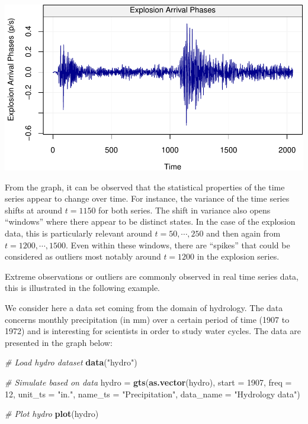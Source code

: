 \documentclass[]{book}
\newenvironment{Shaded}{\begin{snugshade}}{\end{snugshade}}
\newcommand{\CommentTok}[1]{\textcolor[rgb]{0.56,0.35,0.01}{\textit{#1}}}
\newcommand{\DataTypeTok}[1]{\textcolor[rgb]{0.13,0.29,0.53}{#1}}
\newcommand{\DecValTok}[1]{\textcolor[rgb]{0.00,0.00,0.81}{#1}}
\newcommand{\KeywordTok}[1]{\textcolor[rgb]{0.13,0.29,0.53}{\textbf{#1}}}
\newcommand{\NormalTok}[1]{#1}
\newcommand{\StringTok}[1]{\textcolor[rgb]{0.31,0.60,0.02}{#1}}
\theoremstyle{definition}
\theoremstyle{definition}
\theoremstyle{definition}
\theoremstyle{remark}
\let\BeginKnitrBlock\begin \let\EndKnitrBlock\end
\begin{document}
\begin{center}\includegraphics{ts_files/figure-latex/example_EQ-2} \end{center}

From the graph, it can be observed that the statistical properties of
the time series appear to change over time. For instance, the variance
of the time series shifts at around \(t = 1150\) for both series. The
shift in variance also opens ``windows'' where there appear to be
distinct states. In the case of the explosion data, this is particularly
relevant around \(t = 50, \cdots, 250\) and then again from
\(t = 1200, \cdots, 1500\). Even within these windows, there are
``spikes'' that could be considered as outliers most notably around
\(t = 1200\) in the explosion series.

Extreme observations or outliers are commonly observed in real time
series data, this is illustrated in the following example.

\BeginKnitrBlock{example}
\protect\hypertarget{exm:precipitation}{}{\label{exm:precipitation} }We
consider here a data set coming from the domain of hydrology. The data
concerns monthly precipitation (in mm) over a certain period of time
(1907 to 1972) and is interesting for scientists in order to study water
cycles. The data are presented in the graph below:
\EndKnitrBlock{example}

\begin{Shaded}
\begin{Highlighting}[]
\CommentTok{# Load hydro dataset}
\KeywordTok{data}\NormalTok{(}\StringTok{"hydro"}\NormalTok{)}

\CommentTok{# Simulate based on data}
\NormalTok{hydro =}\StringTok{ }\KeywordTok{gts}\NormalTok{(}\KeywordTok{as.vector}\NormalTok{(hydro), }\DataTypeTok{start =} \DecValTok{1907}\NormalTok{, }\DataTypeTok{freq =} \DecValTok{12}\NormalTok{, }\DataTypeTok{unit_ts =} \StringTok{"in."}\NormalTok{, }
            \DataTypeTok{name_ts =} \StringTok{"Precipitation"}\NormalTok{, }\DataTypeTok{data_name =} \StringTok{"Hydrology data"}\NormalTok{)}

\CommentTok{# Plot hydro }
\KeywordTok{plot}\NormalTok{(hydro)}
\end{Highlighting}
\end{Shaded}
\end{document}
